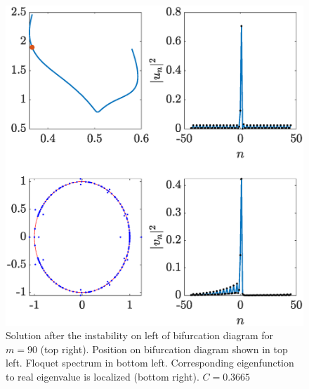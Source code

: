 \documentclass{article}
\begin{document}
\begin{figure}[H]
    \centering
    \includegraphics[width=12cm]{rightafterinstabilityL}
    \caption{Solution after the instability on left of bifurcation diagram for $m=90$ (top right). Position on bifurcation diagram shown in top left. Floquet spectrum in bottom left. Corresponding eigenfunction to real eigenvalue is localized (bottom right). $C = 0.3665$}
    \label{fig:rightinstabL}
\end{figure}
\end{document}
